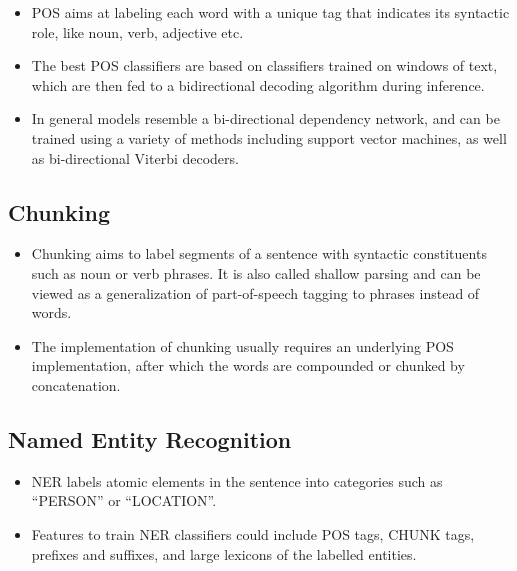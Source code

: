 \documentclass[11pt,a4paper]{article}
\begin{document}
    \begin{itemize}
      \item
      POS aims at labeling each word with a unique tag that indicates its syntactic role, like noun, verb, adjective etc.
      \item
      The best POS classifiers are based on classifiers trained on windows of text, which are then fed to a bidirectional decoding algorithm during inference.
      \item
      In general models resemble a bi-directional dependency network, and can be trained using a variety of methods including support vector machines, as well as bi-directional Viterbi decoders.
    \end{itemize}


  \subsection{Chunking} %
  \label{sub:chunking}

    \begin{itemize}
      \item
      Chunking aims to label segments of a sentence with syntactic constituents such as noun or verb phrases. It is also called shallow parsing and can be viewed as a generalization of part-of-speech tagging to phrases instead of words.
      \item
      The implementation of chunking usually requires an underlying POS implementation, after which the words are compounded or chunked by concatenation.
    \end{itemize}


  \subsection{Named Entity Recognition} %
  \label{sub:named_entity_recognition}

    \begin{itemize}
      \item
      NER labels atomic elements in the sentence into categories such as “PERSON” or “LOCATION”.
      \item
      Features to train NER classifiers could include POS tags, CHUNK tags, prefixes and suffixes, and large lexicons of the labelled entities.
    \end{itemize}
\end{document}
